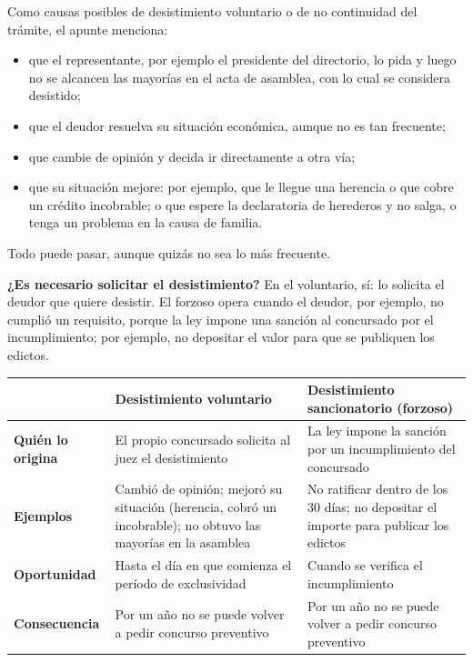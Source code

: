 \documentclass[12pt,oneside]{book}
\begin{document}
Como causas posibles de desistimiento voluntario o de no continuidad del trámite, el apunte menciona:
\begin{itemize}
    \item que el representante, por ejemplo el presidente del directorio, lo pida y luego no se alcancen las mayorías en el acta de asamblea, con lo cual se considera desistido;
    \item que el deudor resuelva su situación económica, aunque no es tan frecuente;
    \item que cambie de opinión y decida ir directamente a otra vía;
    \item que su situación mejore: por ejemplo, que le llegue una herencia o que cobre un crédito incobrable; o que espere la declaratoria de herederos y no salga, o tenga un problema en la causa de familia.
\end{itemize}
Todo puede pasar, aunque quizás no sea lo más frecuente.

\textbf{¿Es necesario solicitar el desistimiento?} En el voluntario, sí: lo solicita el deudor que quiere desistir. El forzoso opera cuando el deudor, por ejemplo, no cumplió un requisito, porque la ley impone una sanción al concursado por el incumplimiento; por ejemplo, no depositar el valor para que se publiquen los edictos.

\begingroup
\small
\renewcommand{\arraystretch}{1.25}
\begin{tabularx}{\textwidth}{>{\raggedright\arraybackslash}p{} Y Y}
\toprule
 & \textbf{Desistimiento voluntario} & \textbf{Desistimiento sancionatorio (forzoso)} \\
\midrule
\textbf{Quién lo origina} & El propio concursado solicita al juez el desistimiento & La ley impone la sanción por un incumplimiento del concursado \\
\textbf{Ejemplos} & Cambió de opinión; mejoró su situación (herencia, cobró un incobrable); no obtuvo las mayorías en la asamblea & No ratificar dentro de los 30 días; no depositar el importe para publicar los edictos \\
\textbf{Oportunidad} & Hasta el día en que comienza el período de exclusividad & Cuando se verifica el incumplimiento \\
\textbf{Consecuencia} & Por un año no se puede volver a pedir concurso preventivo & Por un año no se puede volver a pedir concurso preventivo \\
\bottomrule
\end{tabularx}
\endgroup
\end{document}

